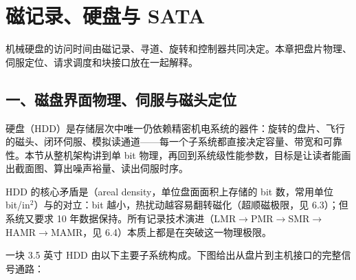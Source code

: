 \chapter{磁记录、硬盘与 SATA}

\begin{keyidea}
机械硬盘的访问时间由磁记录、寻道、旋转和控制器共同决定。本章把盘片物理、伺服定位、请求调度和块接口放在一起解释。
\end{keyidea}

\section{一、磁盘界面物理、伺服与磁头定位}

硬盘（HDD）是存储层次中唯一仍依赖精密机电系统的器件：旋转的盘片、飞行的磁头、闭环伺服、模拟读通道——每一个子系统都直接决定容量、带宽和可靠性。本节从整机架构讲到单 bit 物理，再回到系统级性能参数，目标是让读者能画出截面图、算出噪声裕量、读出伺服时序。

\begin{keyidea}
HDD 的核心矛盾是（areal density，单位盘面面积上存储的 bit 数，常用单位 bit/in$^2$）与的对立：bit 越小，热扰动越容易翻转磁化（超顺磁极限，见 6.3）；但系统又要求 10 年数据保持。所有记录技术演进（LMR$\to$PMR$\to$SMR$\to$HAMR$\to$MAMR，见 6.4）本质上都是在突破这一物理极限。
\end{keyidea}


一块 3.5 英寸 HDD 由以下主要子系统构成。下图给出从盘片到主机接口的完整信号通路：

